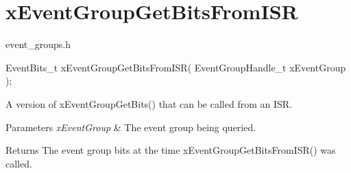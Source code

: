 \hypertarget{group__xEventGroupGetBitsFromISR}{}\section{x\+Event\+Group\+Get\+Bits\+From\+I\+SR}
\label{group__xEventGroupGetBitsFromISR}
event\+\_\+groups.\+h 
\begin{DoxyPre}
   EventBits\_t xEventGroupGetBitsFromISR( EventGroupHandle\_t xEventGroup );
\end{DoxyPre}


A version of x\+Event\+Group\+Get\+Bits() that can be called from an I\+SR.


\begin{DoxyParams}{Parameters}
{\em x\+Event\+Group} & The event group being queried.\\
\hline
\end{DoxyParams}
\begin{DoxyReturn}{Returns}
The event group bits at the time x\+Event\+Group\+Get\+Bits\+From\+I\+S\+R() was called. 
\end{DoxyReturn}
